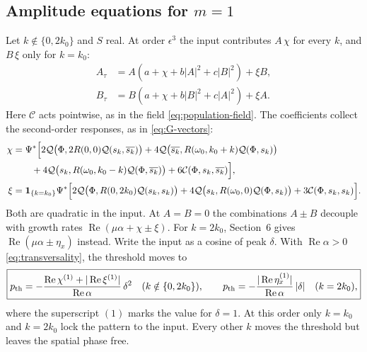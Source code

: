 \documentclass[11pt]{article}
\newcommand{\cQ}{\mathcal{Q}}
\newcommand{\cC}{\mathcal{C}}
\newcommand{\one}[1]{\bm{1}_{\{#1\}}}
\DeclareMathOperator{\RePart}{Re}
\begin{document}
\subsection{Amplitude equations for $m=1$}
Let $k\notin\{0,2k_0\}$ and $S$ real. At order $\epsilon^3$ the input
contributes $A\,\chi$ for every $k$, and $B\,\xi$ only for $k=k_0$:
\begin{subequations}
\label{eq:static-amplitude}
\begin{align}
 A_\tau&=A\left(a+\chi+b|A|^2+c|B|^2\right)+\xi B,\\
 B_\tau&=B\left(a+\chi+b|B|^2+c|A|^2\right)+\xi A.
\end{align}
\end{subequations}
Here $\cC$ acts pointwise, as in the field \eqref{eq:population-field}. The
coefficients collect the second-order responses, as in \eqref{eq:G-vectors}:
\begin{align}
 \chi&=\Psi^*\Bigl[2\cQ\bigl(\Phi,2R(0,0)\cQ(s_k,\overline{s_k})\bigr)
 +4\cQ\bigl(\overline{s_k},R(\omega_0,k_0+k)\cQ(\Phi,s_k)\bigr)\notag\\
 &\qquad+4\cQ\bigl(s_k,R(\omega_0,k_0-k)\cQ(\Phi,\overline{s_k})\bigr)
 +6\cC(\Phi,s_k,\overline{s_k})\Bigr],\notag\\
 \xi&=\one{k=k_0}\Psi^*\Bigl[2\cQ\bigl(\Phi,R(0,2k_0)\cQ(s_k,s_k)\bigr)
 +4\cQ\bigl(s_k,R(\omega_0,0)\cQ(\Phi,s_k)\bigr)
 +3\cC(\Phi,s_k,s_k)\Bigr].
 \label{eq:chi-xi}
\end{align}
Both are quadratic in the input. At $A=B=0$ the combinations $A\pm B$
decouple with growth rates $\RePart(\mu\alpha+\chi\pm\xi)$. For $k=2k_0$,
Section~6 gives $\RePart(\mu\alpha\pm\eta_x)$ instead. Write the input as a
cosine of peak $\delta$. With $\RePart\alpha>0$ \eqref{eq:transversality}, the
threshold moves to
\begin{equation}
 \boxed{p_{\rm th}=-\frac{\RePart\chi^{(1)}+|\RePart\xi^{(1)}|}{\RePart\alpha}\,\delta^2
 \quad(k\notin\{0,2k_0\}),\qquad
 p_{\rm th}=-\frac{|\RePart\eta_x^{(1)}|}{\RePart\alpha}\,|\delta|
 \quad(k=2k_0),}
 \label{eq:threshold-shift}
\end{equation}
where the superscript $(1)$ marks the value for $\delta=1$. At this order
only $k=k_0$ and $k=2k_0$ lock the pattern to the input. Every other $k$ moves
the threshold but leaves the spatial phase free.
\end{document}
